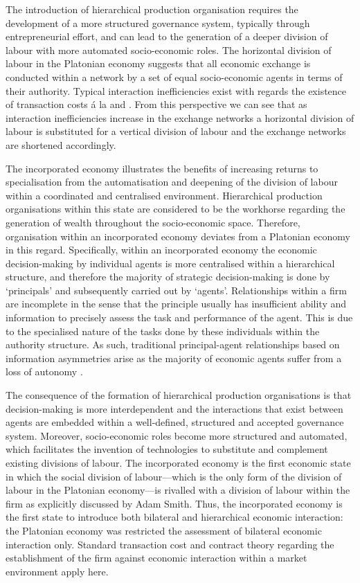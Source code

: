 The introduction of hierarchical production organisation requires the development of a more structured governance system, typically through entrepreneurial effort, and can lead to the generation of a deeper division of labour with more automated socio-economic roles. The horizontal division of labour in the Platonian economy suggests that all economic exchange is conducted within a network by a set of equal socio-economic agents in terms of their authority. Typical interaction inefficiencies exist with regards the existence of transaction costs \'{a} la \citet{Coase1937} and \citet{Williamson1971, Williamson1975, Williamson1979}. From this perspective we can see that as interaction inefficiencies increase in the exchange networks a horizontal division of labour is substituted for a vertical division of labour and the exchange networks are shortened accordingly.

The incorporated economy illustrates the benefits of increasing returns to specialisation from the automatisation and deepening of the division of labour within a coordinated and centralised environment. Hierarchical production organisations within this state are considered to be the workhorse regarding the generation of wealth throughout the socio-economic space. Therefore, organisation within an incorporated economy deviates from a Platonian economy in this regard. Specifically, within an incorporated economy the economic decision-making by individual agents is more centralised within a hierarchical structure, and therefore the majority of strategic decision-making is done by `principals' and subsequently carried out by `agents'. Relationships within a firm are incomplete in the sense that the principle usually has insufficient ability and information to precisely assess the task and performance of the agent. This is due to the specialised nature of the tasks done by these individuals within the authority structure. As such, traditional principal-agent relationships based on information asymmetries arise as the majority of economic agents suffer from a loss of autonomy \citep{JensenMeckling1976, Eisenhardt1989}.

The consequence of the formation of hierarchical production organisations is that decision-making is more interdependent and the interactions that exist between agents are embedded within a well-defined, structured and accepted governance system. Moreover, socio-economic roles become more structured and automated, which facilitates the invention of technologies to substitute and complement existing divisions of labour. The incorporated economy is the first economic state in which the social division of labour---which is the only form of the division of labour in the Platonian economy---is rivalled with a division of labour within the firm as explicitly discussed by Adam Smith. Thus, the incorporated economy is the first state to introduce both bilateral and hierarchical economic interaction: the Platonian economy was restricted the assessment of bilateral economic interaction only. Standard transaction cost and contract theory \citep{Cheung1983, AghionHolden2011} regarding the establishment of the firm against economic interaction within a market environment apply here.

